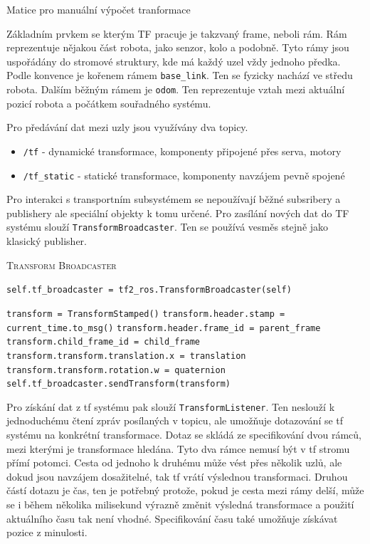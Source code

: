 \begin{center}
	Matice pro manuální výpočet tranformace
\end{center}

Základním prvkem se kterým TF pracuje je takzvaný frame, neboli rám. Rám reprezentuje nějakou část robota, jako senzor, kolo a podobně. Tyto rámy jsou uspořádány do stromové struktury, kde má každý uzel vždy jednoho předka. Podle konvence je kořenem rámem \verb|base_link|. Ten se fyzicky nachází ve středu robota. Dalším běžným rámem je \verb|odom|. Ten reprezentuje vztah mezi aktuální pozicí robota a počátkem souřadného systému.

Pro předávání dat mezi uzly jsou využívány dva topicy.
\begin{itemize}
	\item {\verb|/tf| - dynamické transformace, komponenty připojené přes serva, motory}
	\item {\verb|/tf_static| - statické transformace, komponenty navzájem pevně spojené}
\end{itemize}
Pro interakci s transportním subsystémem se nepoužívají běžné subsribery a publishery ale speciální objekty k tomu určené.
Pro zasílání nových dat do TF systému slouží \verb|TransformBroadcaster|. Ten se používá vesměs stejně jako klasický publisher.

\begin{algorithm}[h!]
	\label{}
	\caption{\textsc{Transform Broadcaster}}
	
	\DontPrintSemicolon
	\SetAlgoNoLine
	\SetNlSty{}{}{:}
	\SetNlSkip{-1.1em}
	
	\BlankLine \Indp\Indpp
	
    \texttt{self.tf\_broadcaster = tf2\_ros.TransformBroadcaster(self)}\;
 
 	\BlankLine
	\texttt{transform = TransformStamped()}\;
	\texttt{transform.header.stamp = current\_time.to\_msg()}\;
	\texttt{transform.header.frame\_id = parent\_frame}\;
	\texttt{transform.child\_frame\_id = child\_frame}\;
	\texttt{transform.transform.translation.x = translation}\;
	\texttt{transform.transform.rotation.w = quaternion}\;
	\texttt{self.tf\_broadcaster.sendTransform(transform)}\;
	
\end{algorithm}

Pro získání dat z tf systému pak slouží \verb|TransformListener|. Ten neslouží k jednoduchému čtení zpráv posílaných v topicu, ale umožňuje dotazování se tf systému na konkrétní transformace. Dotaz se skládá ze specifikování dvou rámců, mezi kterými je transformace hledána. Tyto dva rámce nemusí být v tf stromu přímí potomci. Cesta od jednoho k druhému může vést přes několik uzlů, ale dokud jsou navzájem dosažitelné, tak tf vrátí výslednou transformaci. Druhou částí dotazu je čas, ten je potřebný protože, pokud je cesta mezi rámy delší, může se i během několika milisekund výrazně změnit výsledná transformace a použití aktuálního času tak není vhodné. Specifikování času také umožňuje získávat pozice z minulosti.

